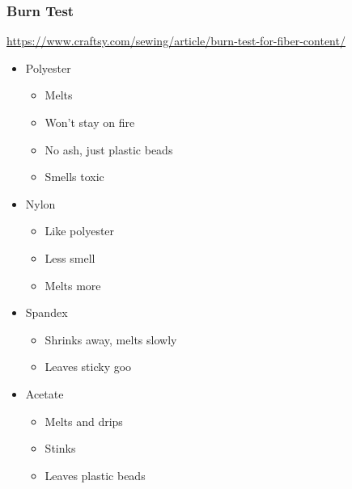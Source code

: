 \documentclass{beamer}
\begin{document}
\begin{frame}[fragile]
\frametitle{Burn Test}
\url{https://www.craftsy.com/sewing/article/burn-test-for-fiber-content/}
\begin{itemize}
\item Polyester
    \begin{itemize}
        \item Melts
        \item Won't stay on fire
        \item No ash, just plastic beads
        \item Smells toxic
    \end{itemize}
\item Nylon
    \begin{itemize}
        \item Like polyester
        \item Less smell
        \item Melts more
    \end{itemize}
\item Spandex
    \begin{itemize}
        \item Shrinks away, melts slowly
        \item Leaves sticky goo
    \end{itemize}
\item Acetate
    \begin{itemize}
        \item Melts and drips
        \item Stinks
        \item Leaves plastic beads
    \end{itemize}
\end{itemize}
\end{frame}
\end{document}

